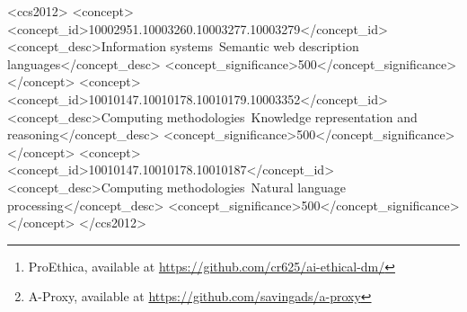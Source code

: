 \documentclass[sigconf,anonymous]{acmart}
\begin{document}
\begin{abstract}
We present a novel Model Context Protocol (MCP) service that enables structured ontological knowledge integration with Large Language Models (LLMs). This framework addresses the challenge of providing LLMs with formalized domain-specific knowledge through a dedicated ontology service built on the Basic Formal Ontology (BFO). Our approach provides two key components: (1) an agent module that facilitates communication between LLMs and ontological structures through standardized interfaces, and (2) an ontology MCP server that represents semantic knowledge as RDF triples with persistent Internationalized Resource Identifiers (IRIs) and supports dynamic content negotiation. The system further enables temporal reasoning by extending RDF structures to represent ordered sequences of events, facilitating causal trace construction (without asserting the underlying causality). Through implementation in two applications \textit{ProEthica} \footnote{ProEthica, available at \url{https://github.com/cr625/ai-ethical-dm/}}
 and \textit{A-Proxy}\footnote{A-Proxy, available at \url{https://github.com/savingads/a-proxy}}
We demonstrate how this service can enhance structured knowledge integration across different domains. Empirical evaluation shows significant improvements in knowledge integration, reasoning consistency, and alignment with domain-specific requirements compared to unstructured approaches. Our framework contributes a generalizable method for bridging symbolic knowledge representation with statistical language models, with implications for semantic web applications, AI alignment, and domain-specific reasoning systems.
  
\end{abstract}


\begin{CCSXML}
<ccs2012>
   <concept>
       <concept_id>10002951.10003260.10003277.10003279</concept_id>
       <concept_desc>Information systems~Semantic web description languages</concept_desc>
       <concept_significance>500</concept_significance>
   </concept>
   <concept>
       <concept_id>10010147.10010178.10010179.10003352</concept_id>
       <concept_desc>Computing methodologies~Knowledge representation and reasoning</concept_desc>
       <concept_significance>500</concept_significance>
   </concept>
   <concept>
       <concept_id>10010147.10010178.10010187</concept_id>
       <concept_desc>Computing methodologies~Natural language processing</concept_desc>
       <concept_significance>500</concept_significance>
   </concept>
</ccs2012>
\end{CCSXML}
\end{document}
